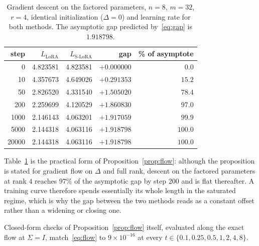 \documentclass{article}
\theoremstyle{remark}
\begin{document}
\begin{table}[h]
\centering
\caption{Gradient descent on the factored parameters, $n=8$, $m=32$, $r=4$,
identical initialization ($\Delta=0$) and learning rate for both methods. The
asymptotic gap predicted by~\eqref{eq:gap} is $1.918798$.}
\label{tab:gdcheck}
\begin{tabular}{rrrrr}
\toprule
step & $L_{\mathrm{LoRA}}$ & $L_{\text{S-LoRA}}$ & gap & \% of asymptote \\
\midrule
      0 & 4.823581 & 4.823581 & $+0.000000$ &   $0.0$ \\
     10 & 4.357673 & 4.649026 & $+0.291353$ &  $15.2$ \\
     50 & 2.826520 & 4.331540 & $+1.505020$ &  $78.4$ \\
    200 & 2.259699 & 4.120529 & $+1.860830$ &  $97.0$ \\
   1000 & 2.146143 & 4.063201 & $+1.917059$ &  $99.9$ \\
   5000 & 2.144318 & 4.063116 & $+1.918798$ & $100.0$ \\
  20000 & 2.144318 & 4.063116 & $+1.918798$ & $100.0$ \\
\bottomrule
\end{tabular}
\end{table}

Table~\ref{tab:gdcheck} is the practical form of
Proposition~\ref{prop:flow}: although the proposition is stated for gradient
flow on $\Delta$ and full rank, descent on the factored parameters at rank $4$
reaches $97\%$ of the asymptotic gap by step $200$ and is flat thereafter. A
training curve therefore spends essentially its whole length in the saturated
regime, which is why the gap between the two methods reads as a constant offset
rather than a widening or closing one.

Closed-form checks of Proposition~\ref{prop:flow} itself, evaluated along the
exact flow at $\Sigma=I$, match~\eqref{eq:flow} to $9\times10^{-16}$ at every
$t\in\{0.1,0.25,0.5,1,2,4,8\}$.



\end{document}
